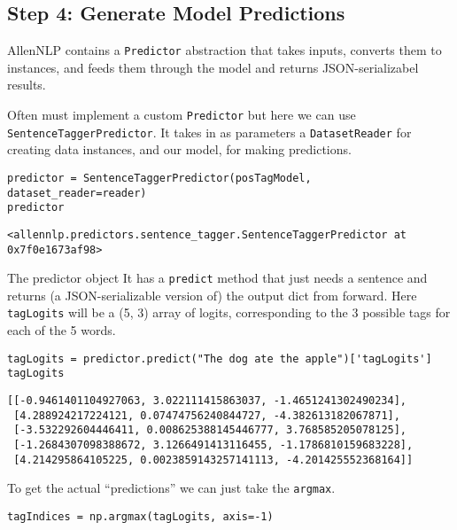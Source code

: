\documentclass[
]{article}
\begin{document}
\hypertarget{step-4-generate-model-predictions}{%
\subsection{Step 4: Generate Model
Predictions}\label{step-4-generate-model-predictions}}

AllenNLP contains a \texttt{Predictor} abstraction that takes inputs,
converts them to instances, and feeds them through the model and returns
JSON-serializabel results.

Often must implement a custom \texttt{Predictor} but here we can use
\texttt{SentenceTaggerPredictor}. It takes in as parameters a
\texttt{DatasetReader} for creating data instances, and our model, for
making predictions.

\begin{verbatim}
predictor = SentenceTaggerPredictor(posTagModel, dataset_reader=reader)
predictor
\end{verbatim}

\begin{verbatim}
<allennlp.predictors.sentence_tagger.SentenceTaggerPredictor at 0x7f0e1673af98>
\end{verbatim}

The predictor object It has a \texttt{predict} method that just needs a
sentence and returns (a JSON-serializable version of) the output dict
from forward. Here \texttt{tagLogits} will be a (5, 3) array of logits,
corresponding to the 3 possible tags for each of the 5 words.

\begin{verbatim}
tagLogits = predictor.predict("The dog ate the apple")['tagLogits']
tagLogits
\end{verbatim}

\begin{verbatim}
[[-0.9461401104927063, 3.022111415863037, -1.4651241302490234],
 [4.288924217224121, 0.07474756240844727, -4.382613182067871],
 [-3.532292604446411, 0.008625388145446777, 3.768585205078125],
 [-1.2684307098388672, 3.1266491413116455, -1.1786810159683228],
 [4.214295864105225, 0.0023859143257141113, -4.201425552368164]]
\end{verbatim}

To get the actual ``predictions'' we can just take the \texttt{argmax}.

\begin{verbatim}
tagIndices = np.argmax(tagLogits, axis=-1)
\end{verbatim}
\end{document}
